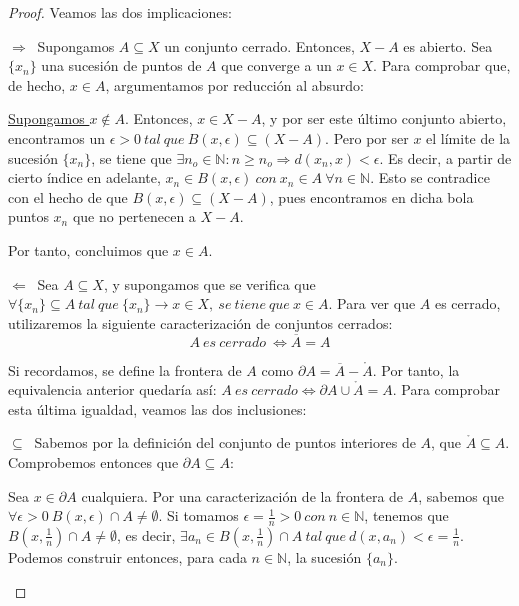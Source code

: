 \begin{proof}
Veamos las dos implicaciones:

$\displaystyle \boxed{\Rightarrow}\ $ Supongamos $A \subseteq X$ un conjunto cerrado. Entonces, $X - A$ es abierto. Sea $\{x_n\}$ una sucesión de puntos de $A$ que converge a un $x\in X$. Para comprobar que, de hecho, $x\in A$, argumentamos por reducción al absurdo:

\underline{Supongamos $x\notin A$}. Entonces, $x\in X - A$, y por ser este último conjunto abierto, encontramos un $\epsilon > 0\ tal\ que\ B(x,\epsilon)\subseteq (X-A)$. Pero por ser $x$ el límite de la sucesión $\{x_n\}$, se tiene que $\exists n_o \in \mathbb{N}: n\geq n_o \Rightarrow d(x_n,x)<\epsilon$. Es decir, a partir de cierto índice en adelante, $x_n \in B(x,\epsilon)\ con\ x_n \in A\ \forall n \in \mathbb{N}$. Esto se contradice con el hecho de que $B(x,\epsilon)\subseteq (X-A)$, pues encontramos en dicha bola puntos $x_n$ que no pertenecen a $X-A$.

Por tanto, concluimos que $x\in A$.

$\displaystyle \boxed{\Leftarrow}\ $ Sea $A\subseteq X$, y supongamos que se verifica que $\forall \{x_n\} \subseteq A\ tal\ que\ \{x_n\} \rightarrow x \in X,\ se\ tiene\ que\ x\in A$. Para ver que $A$ es cerrado, utilizaremos la siguiente caracterización de conjuntos cerrados:
\vspace{0.5em}
$$A\ es\ cerrado\ \iff \overline{A} = A $$

Si recordamos, se define la frontera de $A$ como $\partial A = \overline{A} - \mathring{A}$. Por tanto, la equivalencia anterior quedaría así: $A\ es\ cerrado \iff \partial A \cup \mathring{A} = A$. Para comprobar esta última igualdad, veamos las dos inclusiones:

\begin{description}
\item $\displaystyle \boxed{\subseteq}\ $ Sabemos por la definición del conjunto de puntos interiores de $A$, que $\mathring{A} \subseteq A$. \\ Comprobemos entonces que $\partial A \subseteq A$:

Sea $x\in \partial A$ cualquiera. Por una caracterización de la frontera de $A$, sabemos que $\forall \epsilon > 0\ B(x,\epsilon)\cap A \neq \emptyset$. Si tomamos $\epsilon = \frac{1}{n} > 0\ con \ n\in \mathbb{N}$, tenemos que $B(x,\frac{1}{n})\cap A \neq \emptyset$, es decir, $\exists a_n \in B(x,\frac{1}{n})\cap A\ tal\ que\ d(x,a_n)<\epsilon = \frac{1}{n}$. Podemos construir entonces, para cada $n \in \mathbb{N}$, la sucesión $\{a_n\}$.


\end{description}
\end{proof}
